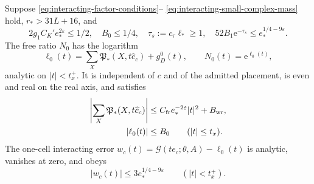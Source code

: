 \begin{proposition}\label{prop:interacting-one-cell}
Suppose \eqref{eq:interacting-factor-conditions}--%
\eqref{eq:interacting-small-complex-mass} hold,
$r_*>31L+16$, and
\begin{equation}\label{eq:interacting-one-cell-conditions}
 2g_1C_K'e_*^{2\varepsilon}\le1/2,\quad
 B_0\le1/4,\quad
 \tau_s:=c_\tau\ell_*\ge1,\quad
 52B_1\mathrm e^{-\tau_s}\le e_*^{1/4-9\varepsilon}.
\end{equation}
The free ratio $N_0$ has the logarithm
\begin{equation}\label{eq:interacting-one-cell-free-log}
 \ell_0(t)=\sum_X\mathfrak P_*(X,t\widehat c_c)+g_D^0(t),
 \qquad N_0(t)=\mathrm e^{\ell_0(t)} ,
\end{equation}
analytic on $|t|<t_x^+$. It is independent of
$c$ and of the admitted placement, is even
and real on the real axis, and satisfies
\begin{align}
 \left|\sum_X\mathfrak P_*(X,t\widehat c_c)\right|
        &\le C_{\rm fr}e_*^{-2\varepsilon}|t|^2+B_{\rm wr},
                                  \label{eq:interacting-P-probe-gain}\\
 |\ell_0(t)|&\le B_0\qquad(|t|\le t_x).
                                  \label{eq:interacting-free-log-bound}
\end{align}
The one-cell interacting error
$w_c(t)=\mathcal G(te_c;\theta,A)-\ell_0(t)$
is analytic, vanishes at zero, and obeys
\begin{equation}\label{eq:interacting-one-cell-error}
 |w_c(t)|\le3e_*^{1/4-9\varepsilon}
                         \qquad(|t|<t_x^+).
\end{equation}
\end{proposition}

